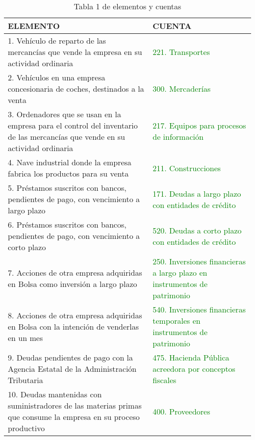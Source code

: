 \documentclass[a4paper,12pt]{article}
\begin{document}
 


    \begin{table}[H]
        \centering
        \begin{tabular}{|p{5cm}|p{5cm}|}
            \hline
            \textbf{ELEMENTO} & \textbf{CUENTA} \\ \hline
            1. Vehículo de reparto de las mercancías que vende la empresa en su actividad ordinaria & \textcolor{green}{221. Transportes} \\ \hline
            2. Vehículos en una empresa concesionaria de coches, destinados a la venta & \textcolor{green}{300. Mercaderías} \\ \hline
            3. Ordenadores que se usan en la empresa para el control del inventario de las mercancías que vende en su actividad ordinaria & \textcolor{green}{217. Equipos para procesos de información} \\ \hline
            4. Nave industrial donde la empresa fabrica los productos para su venta & \textcolor{green}{211. Construcciones} \\ \hline
            5. Préstamos suscritos con bancos, pendientes de pago, con vencimiento a largo plazo & \textcolor{green}{171. Deudas a largo plazo con entidades de crédito} \\ \hline
            6. Préstamos suscritos con bancos, pendientes de pago, con vencimiento a corto plazo & \textcolor{green}{520. Deudas a corto plazo con entidades de crédito} \\ \hline
            7. Acciones de otra empresa adquiridas en Bolsa como inversión a largo plazo & \textcolor{green}{250. Inversiones financieras a largo plazo en instrumentos de patrimonio} \\ \hline
            8. Acciones de otra empresa adquiridas en Bolsa con la intención de venderlas en un mes & \textcolor{green}{540. Inversiones financieras temporales en instrumentos de patrimonio} \\ \hline
            9. Deudas pendientes de pago con la Agencia Estatal de la Administración Tributaria & \textcolor{green}{475. Hacienda Pública acreedora por conceptos fiscales} \\ \hline
            10. Deudas mantenidas con suministradores de las materias primas que consume la empresa en su proceso productivo & \textcolor{green}{400. Proveedores} \\ \hline
        \end{tabular}
        \caption{Tabla 1 de elementos y cuentas}
    \end{table}
    
\end{document}
